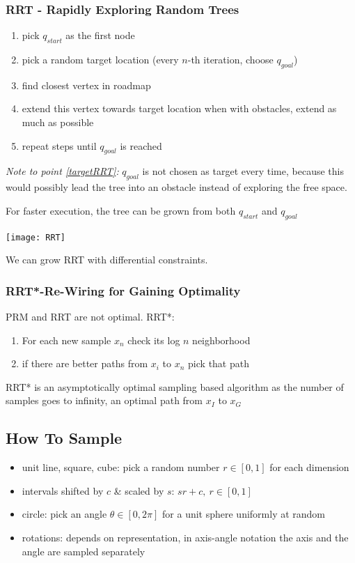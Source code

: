 \begin{multicols*}{2}
\subsubsection{RRT - Rapidly Exploring Random Trees}
\begin{enumerate}
	\item pick $q_{start}$ as the first node
	\item pick a random target location (every $n$-th iteration, choose $q_{goal}$)
	\item find closest vertex in roadmap
	\item extend this vertex towards target location
		\subitem when with obstacles, extend as much as possible 
	\item repeat steps until $q_{goal}$ is reached
\end{enumerate}
\textit{Note to point \ref{targetRRT}:} $q_{goal}$ is not chosen as target every time, because this would possibly lead the tree into an obstacle instead of exploring the free space.

For faster execution, the tree can be grown from both $q_{start}$ and $q_{goal}$

\texttt{[image: RRT]}

We can grow RRT with differential constraints.

\subsubsection{RRT*-Re-Wiring for Gaining Optimality}
PRM and RRT are not optimal.
RRT*:
\begin{enumerate}
	\item For each new sample $x_n$ check its log $n$ neighborhood
	\item if there are better paths from $x_i$ to $x_n$ pick that path
\end{enumerate}
RRT* is an asymptotically optimal sampling based algorithm
	as the number of samples goes to infinity, an optimal path from $x_I$ to $x_G$


\subsection{How To Sample}
\begin{itemize}
	\item unit line, square, cube: pick a random number $r\in [0,1]$ for each dimension
	\item intervals shifted by $c$ \& scaled by $s$: $sr+c, ~ r\in [0,1]$ 
	\item circle: pick an angle $\theta \in [0, 2\pi]$ for a unit sphere uniformly at random
	\item rotations: depends on representation, in axis-angle notation the axis and the angle are sampled separately
\end{itemize}


\end{multicols*}
